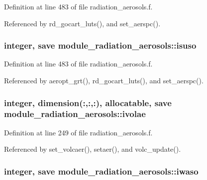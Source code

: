 Definition at line 483 of file radiation\+\_\+aerosols.\+f.



Referenced by rd\+\_\+gocart\+\_\+luts(), and set\+\_\+aerspc().

\subsubsection[{\texorpdfstring{isuso}{isuso}}]{\setlength{\rightskip}{0pt plus 5cm}integer, save module\+\_\+radiation\+\_\+aerosols\+::isuso\hspace{0.3cm}{\ttfamily [private]}}\hypertarget{group__module__radiation__aerosols_gacddb4dccea82201fd3b193c15c85ec78}{}\label{group__module__radiation__aerosols_gacddb4dccea82201fd3b193c15c85ec78}


Definition at line 483 of file radiation\+\_\+aerosols.\+f.



Referenced by aeropt\+\_\+grt(), rd\+\_\+gocart\+\_\+luts(), and set\+\_\+aerspc().

\subsubsection[{\texorpdfstring{ivolae}{ivolae}}]{\setlength{\rightskip}{0pt plus 5cm}integer, dimension(\+:,\+:,\+:), allocatable, save module\+\_\+radiation\+\_\+aerosols\+::ivolae\hspace{0.3cm}{\ttfamily [private]}}\hypertarget{group__module__radiation__aerosols_gab016f51c81a1157ee234dc82f8f114ee}{}\label{group__module__radiation__aerosols_gab016f51c81a1157ee234dc82f8f114ee}


Definition at line 249 of file radiation\+\_\+aerosols.\+f.



Referenced by set\+\_\+volcaer(), setaer(), and volc\+\_\+update().

\subsubsection[{\texorpdfstring{iwaso}{iwaso}}]{\setlength{\rightskip}{0pt plus 5cm}integer, save module\+\_\+radiation\+\_\+aerosols\+::iwaso\hspace{0.3cm}{\ttfamily [private]}}\hypertarget{group__module__radiation__aerosols_gad15292f4a185c28ad44687d95ef4d3a4}{}\label{group__module__radiation__aerosols_gad15292f4a185c28ad44687d95ef4d3a4}


